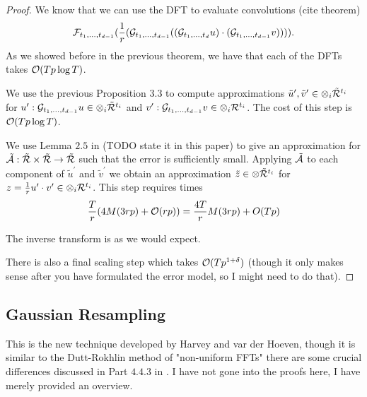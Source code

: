\begin{proof}
    We know that we can use the DFT to evaluate convolutions (cite theorem)
    \[
        \mathcal F_{t_1,\ldots, t_{d-1}}(\frac{1}{r}(\mathcal G_{t_1, \ldots, t_{d-1}}((\mathcal G_{t_1, \ldots, t_d}u)\cdot (\mathcal G_{t_1, \ldots, t_{d-1}} v)))).
    \]
    As we showed before in the previous theorem, we have that each of the DFTs takes $\mathcal O(Tp\log T)$.

    We use the previous Proposition 3.3 to compute approximations $\tilde{u}^\prime, \tilde{v}^\prime \in \otimes_i \tilde{\mathcal R}^{t_i}$ for $u^\prime: \mathcal G_{t_1, \ldots, t_{d-1}} u \in \otimes_i \tilde{\mathcal R}^{t_i}$ and $v^\prime: \mathcal G_{t_1, \ldots, t_{d-1}} v \in \otimes_i \mathcal R^{t_i}$. The cost of this step is $\mathcal O(Tp \log T)$.

    We use Lemma $2.5$ in \cite{nlogn} (TODO state it in this paper) to give an approximation for $\tilde{\mathcal A}: \tilde{\mathcal R} \times \tilde{\mathcal R} \to \tilde{\mathcal R}$ such that the error is sufficiently small. Applying $\tilde{\mathcal A}$ to each component of $\tilde{u}^\prime$ and $\tilde{v}^\prime$ we obtain an approximation $\tilde{z} \in \otimes \tilde{\mathcal R}^{t_i}$ for $z = \frac{1}{r}u^\prime \cdot v^\prime \in \otimes_i \mathcal R^{t_i}$. This step requires times
    \[
        \frac{T}{r}(4M(3rp) + \mathcal O(rp)) = \frac{4T}{r} M(3rp) + O(Tp)
    \]

    The inverse transform is as we would expect.

    There is also a final scaling step which takes $\mathcal O(Tp^{1 + \delta})$ (though it only makes sense after you have formulated the error model, so I might need to do that).
\end{proof}

\subsection{Gaussian Resampling}

This is the new technique developed by Harvey and var der Hoeven, though it is similar to the Dutt-Rokhlin method of "non-uniform FFTs" there are some crucial differences discussed in Part $4.4.3$ in \cite{nlogn}. I have not gone into the proofs here, I have merely provided an overview.

